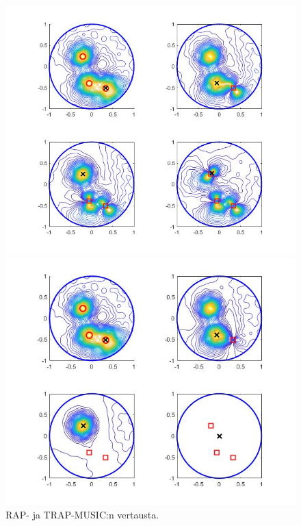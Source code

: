 \clearpage
\begin{figure}[h]
    \begin{minipage}{0.5\textwidth}
        \centering
        \includegraphics[width=\textwidth]{raptrap2.jpg} 
    \end{minipage}
    \begin{minipage}{0.5\textwidth}
        \centering
        \includegraphics[width=\textwidth]{raptrap1.jpg}
    \end{minipage}
    \caption{RAP- ja TRAP-MUSIC:n vertausta.}
\end{figure}


